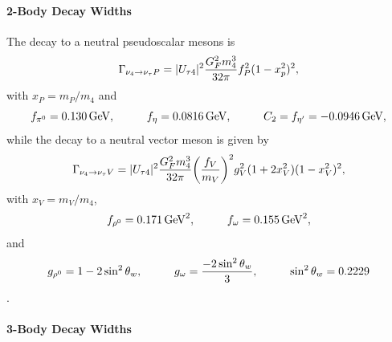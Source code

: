 \paragraph{2-Body Decay Widths}

The decay to a neutral pseudoscalar mesons is
\begin{equation}
    \Gamma_{\nu_4 \rightarrow \nu_\tau P} = |U_{\tau4}|^2 \frac{G_F^2 m_4^3}{32\pi} f_P^2 (1-x_p^2)^2,
    \labeq{gamma_nu_P}
\end{equation}
with $x_P = m_P/m_4$ and
\begin{equation}
    f_{\pi^0} = \SI{0.130}{\GeV}, \hspace{1cm} f_{\eta} = \SI{0.0816}{\GeV}, \hspace{1cm} C_2 = f_{\eta'} = \SI{-0.0946}{\GeV},
    \labeq{gamma_nu_P_f_factors}
\end{equation}
while the decay to a neutral vector meson is given by
\begin{equation}
    \Gamma_{\nu_4 \rightarrow \nu_\tau V} = |U_{\tau4}|^2 \frac{G_F^2 m_4^3}{32\pi} \bigg(\frac{f_V}{m_V}\bigg)^2 g_V^2 (1+2x_V^2) (1-x_V^2)^2,
    \labeq{gamma_nu_V}
\end{equation}
with $x_V = m_V/m_4$,
\begin{equation}
    f_{\rho^0} = \SI{0.171}{\square\GeV}, \hspace{1cm} f_{\omega} = \SI{0.155}{\square\GeV},
    \labeq{gamma_nu_V_f_factors}
\end{equation}
and
\begin{equation}
    g_{\rho^0} = 1-2\sin^2{\theta_w}, \hspace{1cm} g_{\omega} = \frac{-2\sin^2{\theta_w}}{3}, \hspace{1cm} \sin^2{\theta_w} = 0.2229
    \labeq{gamma_nu_V_g_factors}
\end{equation}
.


\paragraph{3-Body Decay Widths}

